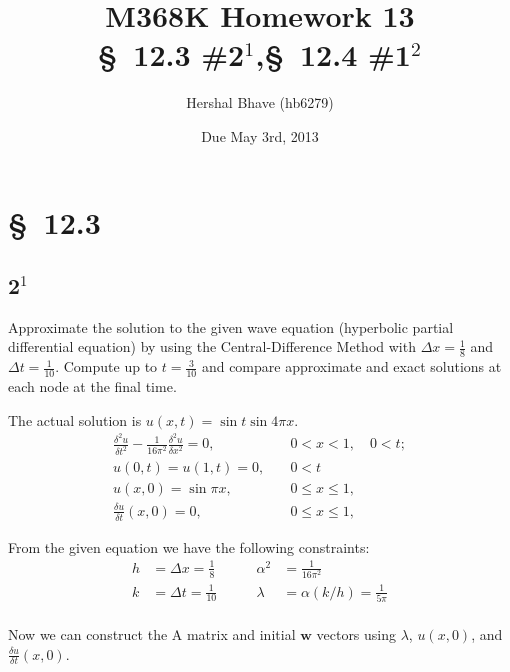 \documentclass[12pt]{article}
\title{M368K Homework 13 \\
  \normalsize{\S~12.3 \#2$^1$,\quad \S~12.4 \#1$^2$ }}
\author{Hershal Bhave (hb6279)}
\date{Due May 3rd, 2013}
\begin{document}
\maketitle

\section{\S~12.3}
\subsection{2$^1$}
Approximate the solution to the given wave equation (hyperbolic
partial differential equation) by using the Central-Difference Method
with $\Delta x = \frac{1}{8}$ and $\Delta t= \frac{1}{10}$. Compute up
to $t=\frac{3}{10}$ and compare approximate and exact solutions at
each node at the final time.

The actual solution is $u(x,t)=\sin t \sin 4\pi x$.
\begin{equation}
  \label{eq:2_q}
  \begin{aligned}
  \frac{\delta^2u}{\delta t^2} - \frac{1}{16\pi^2}
  \frac{\delta^2u}{\delta x^2}  = 0, & \quad 0<x<1,\quad 0<t; \\
  u(0,t) = u(1,t) = 0, & \quad 0<t \\
  u(x,0) = \sin \pi x, & \quad 0\leq x \leq 1, \\
  \frac{\delta u}{\delta t}(x,0) = 0, & \quad 0\leq x \leq 1,
  \end{aligned}
\end{equation}

From the given equation we have the following constraints:
\begin{equation}
  \label{eq:2_const}
  \begin{aligned}
    h &= \Delta x = \frac{1}{8} \qquad&  \alpha^2 &= \frac{1}{16\pi^2} \\
    k &= \Delta t = \frac{1}{10} \qquad& \lambda &= \alpha(k/h) = \frac{1}{5\pi} \\
  \end{aligned}
\end{equation}

Now we can construct the A matrix and initial $\mathbf{w}$ vectors
using $\lambda$, $u(x,0)$, and $\frac{\delta u}{\delta t}(x,0)$.
\end{document}
